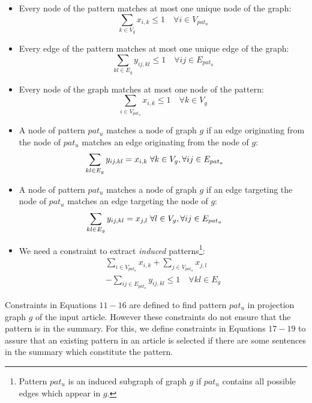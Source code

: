 \begin{itemize}
%
\item Every node of the pattern matches at most one unique node of the graph:
\begin{equation}
\sum_{k\in V_g}x_{i,k} \leq 1 \quad \forall i\in V_{pat_{u}}
\end{equation}
%
\item Every edge of the pattern matches at most one unique edge of the graph:
\begin{equation}
\sum_{kl\in E_g}y_{ij,kl} \leq 1 \quad \forall ij\in E_{pat_{u}}
\end{equation}
%
\item Every node of the graph matches at most one node of the pattern:
\begin{equation}
\sum_{i\in V_{pat_{u}}}x_{i,k} \leq 1 \quad \forall k\in V_g
\end{equation}
%
\item A node of pattern $pat_u$ matches a node of graph $g$ if an edge originating from the node of $pat_u$ matches an edge originating from the node of $g$:
\begin{multline}
\hspace{-2em}
\sum_{kl\in E_g}y_{ij,kl} =  x_{i,k} \; \forall k\in V_g, \forall ij\in E_{pat_{u}}
\end{multline}
%
\item A node of pattern $pat_u$ matches a node of graph $g$ if an edge targeting the node of $pat_u$ matches an edge targeting the node of $g$:
%
\begin{multline}
\hspace{-2em}
\sum_{kl\in E_g}y_{ij,kl} =  x_{j,l} \; \forall l\in V_g, \forall ij\in E_{pat_{u}}
\end{multline}
%
\item We need a constraint to extract \emph{induced} patterns\footnote{Pattern $pat_{u}$ is an induced subgraph of graph $g$ if $pat_{u}$ contains all possible edges which appear in $g$.}:
\begin{multline}
\sum_{i\in V_{pat_{u}}}x_{i,k} + \sum_{j \in V_{pat_{u}}}x_{j,l} \\- \sum_{ij\in E_{pat_{u}}}y_{ij,kl} \leq 1
 \quad \forall kl\in E_g
\end{multline}
\end{itemize}

Constraints in Equations $11-16$ are defined to find pattern $pat_u$ in projection graph $g$ of the input article. However these constraints do not ensure that the pattern is in the summary.
For this, we define constraints in Equations $17-19$ to assure that an existing pattern in an article is selected if there are some sentences in the summary which constitute the pattern.

